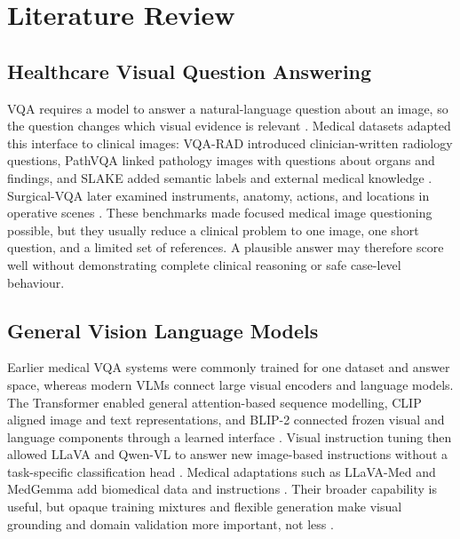 \section{Literature Review}

\subsection{Healthcare Visual Question Answering}

VQA requires a model to answer a natural-language question about an image, so the question changes which visual evidence is relevant \citep{agrawal2016vqa}. Medical datasets adapted this interface to clinical images: VQA-RAD introduced clinician-written radiology questions, PathVQA linked pathology images with questions about organs and findings, and SLAKE added semantic labels and external medical knowledge \citep{lau2018vqarad,he2020pathvqa,liu2021slake}. Surgical-VQA later examined instruments, anatomy, actions, and locations in operative scenes \citep{seenivasan2022surgicalvqa}. These benchmarks made focused medical image questioning possible, but they usually reduce a clinical problem to one image, one short question, and a limited set of references. A plausible answer may therefore score well without demonstrating complete clinical reasoning or safe case-level behaviour.

\subsection{General Vision Language Models}

Earlier medical VQA systems were commonly trained for one dataset and answer space, whereas modern VLMs connect large visual encoders and language models. The Transformer enabled general attention-based sequence modelling, CLIP aligned image and text representations, and BLIP-2 connected frozen visual and language components through a learned interface \citep{vaswani2017attention,radford2021clip,li2023blip2}. Visual instruction tuning then allowed LLaVA and Qwen-VL to answer new image-based instructions without a task-specific classification head \citep{liu2023visualinstruction,bai2023qwenvl}. Medical adaptations such as LLaVA-Med and MedGemma add biomedical data and instructions \citep{li2023llavamed,sellergren2025medgemma}. Their broader capability is useful, but opaque training mixtures and flexible generation make visual grounding and domain validation more important, not less \citep{moor2023foundation,wiens2019donoharm}.

